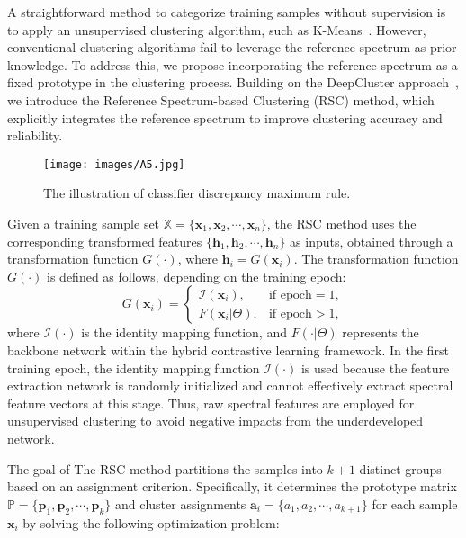 A straightforward method to categorize training samples without supervision is to apply an unsupervised clustering algorithm, such as K-Means~\cite{Sinaga2020}. 
However, conventional clustering algorithms fail to leverage the reference spectrum as prior knowledge. 
To address this, we propose incorporating the reference spectrum as a fixed prototype in the clustering process. 
Building on the DeepCluster approach~\cite{caron2018deep}, we introduce the Reference Spectrum-based Clustering (RSC) method, which explicitly integrates the reference spectrum to improve clustering accuracy and reliability.
\par 
\begin{figure}[!t]                  
    \centering                    
    \texttt{[image: images/A5.jpg]}                     
    \caption{The illustration of classifier discrepancy maximum rule.}                  
    \label{fig:C3}    
\end{figure}
Given a training sample set $\mathbb{X} = \{\bm{x}_1, \bm{x}_2, \cdots, \bm{x}_n\}$, the RSC method uses the corresponding transformed features $\{\bm{h}_1, \bm{h}_2, \cdots, \bm{h}_n\}$ as inputs, obtained through a transformation function $G(\cdot)$, where $\bm{h}_i = G(\bm{x}_i)$. 
The transformation function $G(\cdot)$ is defined as follows, depending on the training epoch:
\begin{equation}\label{eq:transformation}
    G(\bm{x}_i) = 
    \begin{cases}
        \mathcal{I} (\bm{x}_i), & \text{if epoch} = 1, \\
        F(\bm{x}_i|\Theta), & \text{if epoch} > 1,
    \end{cases}
\end{equation}
where $\mathcal{I} (\cdot)$ is the identity mapping function, and $F(\cdot|\Theta)$ represents the backbone network within the hybrid contrastive learning framework. 
In the first training epoch, the identity mapping function $\mathcal{I} (\cdot)$ is used because the feature extraction network is randomly initialized and cannot effectively extract spectral feature vectors at this stage. 
Thus, raw spectral features are employed for unsupervised clustering to avoid negative impacts from the underdeveloped network.
\par
The goal of The RSC method partitions the samples into $k+1$ distinct groups based on an assignment criterion. Specifically, it determines the prototype matrix $\mathbb{P} = \{\bm{p}_1, \bm{p}_2, \cdots, \bm{p}_k\}$ and cluster assignments $\bm{a}_i = \{a_1, a_2, \cdots, a_{k+1}\}$ for each sample $\bm{x}_i$ by solving the following optimization problem:
